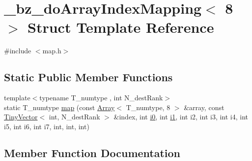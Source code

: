 \hypertarget{struct__bz__doArrayIndexMapping_3_018_01_4}{}\section{\+\_\+bz\+\_\+do\+Array\+Index\+Mapping$<$ 8 $>$ Struct Template Reference}
\label{struct__bz__doArrayIndexMapping_3_018_01_4}


{\ttfamily \#include $<$map.\+h$>$}

\subsection*{Static Public Member Functions}
\begin{DoxyCompactItemize}
\item 
{\footnotesize template$<$typename T\+\_\+numtype , int N\+\_\+dest\+Rank$>$ }\\static T\+\_\+numtype \hyperlink{struct__bz__doArrayIndexMapping_3_018_01_4_a70eb292adc24b277f5713eb7840862a5}{map} (const \hyperlink{classArray}{Array}$<$ T\+\_\+numtype, 8 $>$ \&array, const \hyperlink{classTinyVector}{Tiny\+Vector}$<$ int, N\+\_\+dest\+Rank $>$ \&index, int \hyperlink{cephes_8h_aacd2643d920288e61be16787561a4514}{i0}, int \hyperlink{cephes_8h_ab24474d03df1f9adf1700c2c1badd1a5}{i1}, int i2, int i3, int i4, int i5, int i6, int i7, int, int, int)
\end{DoxyCompactItemize}


\subsection{Member Function Documentation}
\hypertarget{struct__bz__doArrayIndexMapping_3_018_01_4_a70eb292adc24b277f5713eb7840862a5}{}
